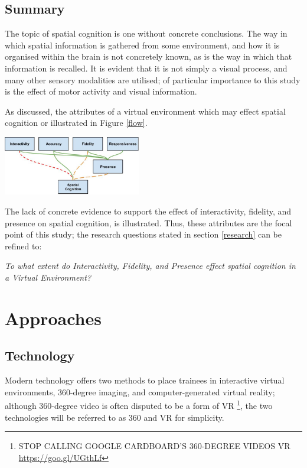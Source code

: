 \documentclass[a4paper, openright, twoside]{book}
\begin{document}
\subsection{Summary}\label{intro-summary}
The topic of spatial cognition is one without concrete conclusions. The way in which spatial information is gathered from some environment, and how it is organised within the brain is not concretely known, as is the way in which that information is recalled. It is evident that it is not simply a visual process, and many other sensory modalities are utilised; of particular importance to this study is the effect of motor activity and visual information. 

As discussed, the attributes of a virtual environment which may effect spatial cognition or illustrated in Figure \ref{flow}.
\begin{minipage}{\textwidth}
\hfill \break
\centering
\includegraphics[width=0.45\textwidth]{images/spatial_cognition_flow.png}
\label{flow}
\hfill \break
\end{minipage}

The lack of concrete evidence to support the effect of interactivity, fidelity, and presence on spatial cognition, is illustrated.  Thus, these attributes are the focal point of this study; the research questions stated in section \ref{research} can be refined to:

\textit{To what extent do Interactivity, Fidelity, and Presence effect spatial cognition in a Virtual Environment?}


\section{Approaches}

\subsection{Technology}
Modern technology offers two methods to place trainees in interactive virtual environments, 360-degree imaging, and computer-generated virtual reality; although 360-degree video is often disputed to be a form of VR \footnote{STOP CALLING GOOGLE CARDBOARD'S 360-DEGREE VIDEOS VR \url{https://goo.gl/UGthLf}}, the two technologies will be referred to as 360 and VR for simplicity.
\end{document}
